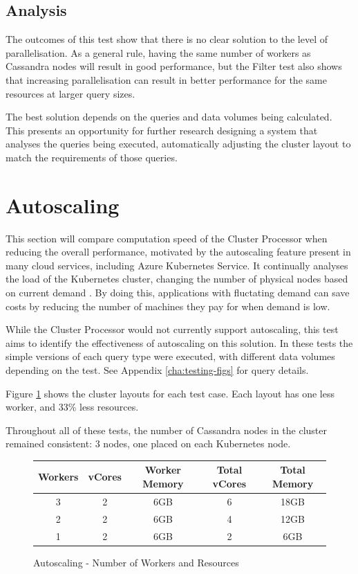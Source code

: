 \subsection{Analysis}
The outcomes of this test show that there is no clear solution to the level of parallelisation. As a general rule, having the same number of workers as Cassandra nodes will result in good performance, but the Filter test also shows that increasing parallelisation can result in better performance for the same resources at larger query sizes. 

The best solution depends on the queries and data volumes being calculated. This presents an opportunity for further research designing a system that analyses the queries being executed, automatically adjusting the cluster layout to match the requirements of those queries.

\section{Autoscaling}
This section will compare computation speed of the Cluster Processor when reducing the overall performance, motivated by the autoscaling feature present in many cloud services, including Azure Kubernetes Service. It continually analyses the load of the Kubernetes cluster, changing the number of physical nodes based on current demand \cite{aksautoscaling}. By doing this, applications with fluctating demand can save costs by reducing the number of machines they pay for when demand is low.

While the Cluster Processor would not currently support autoscaling, this test aims to identify the effectiveness of autoscaling on this solution. In these tests the simple versions of each query type were executed, with different data volumes depending on the test. See Appendix \ref{cha:testing-figs} for query details. 

Figure \ref{fig:autoscale-test-workers} shows the cluster layouts for each test case. Each layout has one less worker, and 33\% less resources.

Throughout all of these tests, the number of Cassandra nodes in the cluster remained consistent: 3 nodes, one placed on each Kubernetes node.

\begin{figure}[ht]
	\centering
	\begin{tabular}{| c | c | c | c | c |}
		\hline
		\textbf{Workers} & \textbf{vCores} & \textbf{Worker Memory} & \textbf{Total vCores} & \textbf{Total Memory} \\ \hline
		3 & 2 & 6GB & 6 & 18GB \\ \hline
		2 & 2 & 6GB & 4 & 12GB \\ \hline
		1 & 2 & 6GB & 2 & 6GB \\ \hline
	\end{tabular}
	\caption{Autoscaling - Number of Workers and Resources}
	\label{fig:autoscale-test-workers}
\end{figure}

